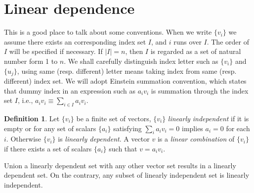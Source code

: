 \documentclass{amsbook}
\theoremstyle{definition}
\newtheorem{definition}[theorem]{Definition}
\theoremstyle{remark}
\numberwithin{section}{chapter}
\numberwithin{equation}{chapter}
\begin{document}
\section{Linear dependence}
This is a good place to talk about some conventions. When we write $\{v_i\}$ we assume there exists an corresponding index set $I$, and $i$ runs over $I$. The order of $I$ will be specified if necessary. If $|I| = n$, then $I$ is regarded as a set of natural number form 1 to $n$. We shall carefully distinguish index letter such as $\{v_i\}$ and $\{u_j\}$, using same (resp. different) letter means taking index from same (resp. different) index set. We will adopt Einstein summation convention, which states that dummy index in an expression such as $a_iv_i$ is summation through the index set $I$, i.e., $a_iv_i\equiv \sum_{i\in I}a_iv_i$.  
\begin{definition}
	Let $\{v_i\}$ be a finite set of vectors, $\{v_i\}$ \emph{linearly independent} if it is empty or for any set of scalars $\{a_i\}$ satisfying $\sum_{i}a_iv_i = 0$ implies $a_i = 0$ for each $i$. Otherwise $\{v_i\}$ is \emph{linearly dependent}. A vector $v$ is a \emph{linear combination} of $\{v_i\}$ if there exists a set of scalars $\{a_i\}$ such that $v = a_iv_i$.
\end{definition}

Union a linearly dependent set with any other vector set results in a linearly dependent set. On the contrary, any subset of linearly independent set is linearly independent. 
\end{document}
